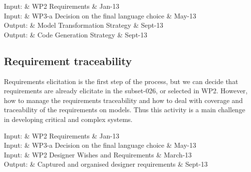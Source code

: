\documentclass{template/openetcs_article}
\begin{document}
%

\begin{inoutput}
Input: & WP2 Requirements & Jan-13 \\
Input: & WP3-a  Decision on the final language choice & May-13 \\
\hline
Output: & Model Transformation Strategy & Sept-13 \\
Output: & Code Generation Strategy & Sept-13 \\
\end{inoutput}


\subsection{Requirement traceability}

Requirements elicitation is the first step of the process, but we can decide that requirements are already elicitate in the subset-026, or selected in WP2. However, how to manage the requirements traceability and how to deal with coverage and traceability of the requirements on models. Thus this activity is a main challenge in developing critical and complex systems.

\begin{inoutput}
Input: & WP2 Requirements & Jan-13 \\
Input: & WP3-a  Decision on the final language choice & May-13 \\
Input: & WP2 Designer Wishes and Requirements & March-13 \\
\hline
Output: & Captured and organised designer requirements & Sept-13 \\
\end{inoutput}
\end{document}
